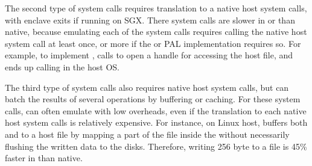 The second type of system calls requires translation to a native host system calls,
with enclave exits if running on SGX.
There system calls are slower in \graphene{} or \graphenesgx{} than native,
because emulating each of the system calls
requires calling the native host system call at least once,
or more if the \thelibos{} or PAL implementation
requires so.
For example, to implement , \thelibos{} calls  to open a handle
for accessing the host file,
and ends up calling  in the host OS.


The third type of system calls also requires native host system calls, but \thelibos{} can batch
the results of several operations by buffering
or caching.
For these system calls,
\thelibos{} can often emulate with low overheads,
even if the translation to each native host system calls is relatively expensive.
For instance, on Linux host, \thelibos{} buffers both  and  to a host file
by mapping a part of the file inside the \picoproc{}
without necessarily flushing the written data to the disks.
Therefore, writing 256 byte
to a file is 45\% faster in
\graphene{} than native.  



